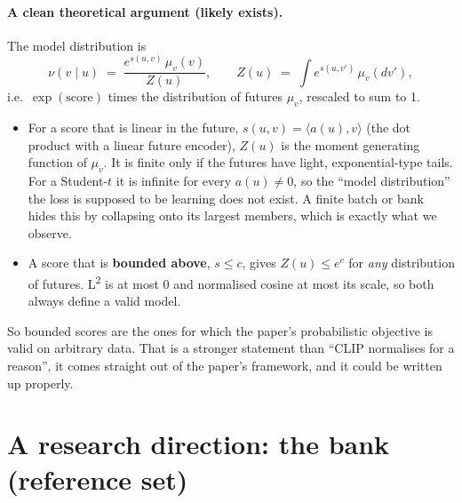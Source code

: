 \documentclass[11pt]{article}
\newcommand{\Ltwo}{L\textsuperscript{2}}
\begin{document}
\paragraph{A clean theoretical argument (likely exists).} The model distribution is
\[
  \nu(v \mid u) \;=\; \frac{e^{s(u,v)}\,\mu_v(v)}{Z(u)},
  \qquad
  Z(u) \;=\; \int e^{s(u,v')}\,\mu_v(dv'),
\]
i.e.\ $\exp(\text{score})$ times the distribution of futures $\mu_v$, rescaled to sum to 1.
\begin{itemize}
\item For a score that is linear in the future, $s(u,v) = \langle a(u), v\rangle$ (the
  dot product with a linear future encoder), $Z(u)$ is the moment generating function of
  $\mu_v$. It is finite only if the futures have light, exponential-type tails. For a
  Student-$t$ it is infinite for every $a(u) \neq 0$, so the ``model distribution'' the loss
  is supposed to be learning does not exist. A finite batch or bank hides this by collapsing
  onto its largest members, which is exactly what we observe.
\item A score that is \textbf{bounded above}, $s \le c$, gives $Z(u) \le e^{c}$ for
  \emph{any} distribution of futures. \Ltwo{} is at most 0 and normalised cosine at most
  its scale, so both always define a valid model.
\end{itemize}
So bounded scores are the ones for which the paper's probabilistic objective is valid on
arbitrary data. That is a stronger statement than ``CLIP normalises for a reason'', it comes
straight out of the paper's framework, and it could be written up properly.

\section{A research direction: the bank (reference set)}
\end{document}
